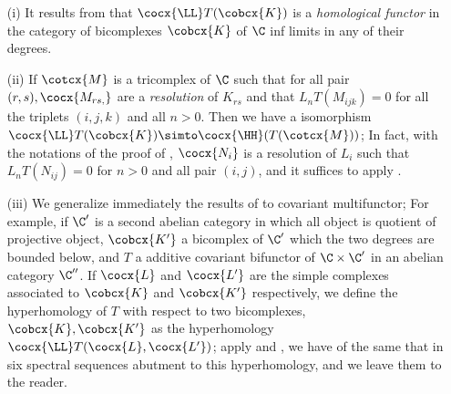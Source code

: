 \begin{remarks}[11.7.3]
\begin{enumerate}
  \item[(i)] It results from  that $\cocx{\LL}T(\cobcx{K})$ is a \emph{homological functor} in the category of bicomplexes $\cobcx{K}$ of $\C$ inf limits in any of their degrees.
  \item[(ii)] If $\cotcx{M}$ is a tricomplex of $\C$ such that for all pair $(r,s), \cocx{M_{rs,}}$ are a \emph{resolution} of $K_{rs}$ and that $L_n T(M_{ijk}) = 0$ for all the triplets $(i,j,k)$ and all $n>0$.
  Then we have a isomorphism $\cocx{\LL} T(\cobcx{K}) \simto \cocx{\HH}(T(\cotcx{M}))$; 
  In fact, with the notations of the proof of , $\cocx{N_i}$ is a resolution of $L_i$ such that $L_n T(N_{ij}) = 0$ for $n>0$ and all pair $(i,j)$, 
  and it suffices to apply .
  \item[(iii)]  We generalize immediately the results of  to covariant multifunctor;
  For example, if $\C'$ is a second abelian category in which all object is quotient of projective object, 
  $\cobcx{K'}$ a bicomplex of $\C'$ which the two degrees are bounded below, and $T$ a additive covariant bifunctor of $\C\times\C'$ in an abelian category $\C''$.
  If $\cocx{L}$ and $\cocx{L'}$ are the simple complexes associated to $\cobcx{K}$ and $\cobcx{K'}$ respectively, 
  we define the hyperhomology of $T$ with respect to two bicomplexes, $\cobcx{K}, \cobcx{K'}$ as the hyperhomology $\cocx{\LL}T(\cocx{L}, \cocx{L'})$;
  apply  and , we have of the same that in  six spectral sequences abutment to this hyperhomology, 
  and we leave them to the reader.
\end{enumerate}
\end{remarks}


